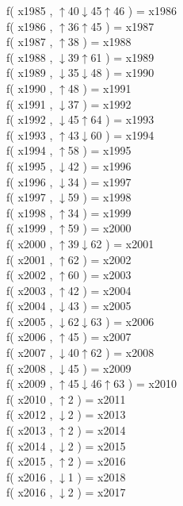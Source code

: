 f( x1985 , $\uparrow$40$\downarrow$45$\uparrow$46 ) = x1986 \\
f( x1986 , $\uparrow$36$\uparrow$45 ) = x1987 \\
f( x1987 , $\uparrow$38 ) = x1988 \\
f( x1988 , $\downarrow$39$\uparrow$61 ) = x1989 \\
f( x1989 , $\downarrow$35$\downarrow$48 ) = x1990 \\
f( x1990 , $\uparrow$48 ) = x1991 \\
f( x1991 , $\downarrow$37 ) = x1992 \\
f( x1992 , $\downarrow$45$\uparrow$64 ) = x1993 \\
f( x1993 , $\uparrow$43$\downarrow$60 ) = x1994 \\
f( x1994 , $\uparrow$58 ) = x1995 \\
f( x1995 , $\downarrow$42 ) = x1996 \\
f( x1996 , $\downarrow$34 ) = x1997 \\
f( x1997 , $\downarrow$59 ) = x1998 \\
f( x1998 , $\uparrow$34 ) = x1999 \\
f( x1999 , $\uparrow$59 ) = x2000 \\
f( x2000 , $\uparrow$39$\downarrow$62 ) = x2001 \\
f( x2001 , $\uparrow$62 ) = x2002 \\
f( x2002 , $\uparrow$60 ) = x2003 \\
f( x2003 , $\uparrow$42 ) = x2004 \\
f( x2004 , $\downarrow$43 ) = x2005 \\
f( x2005 , $\downarrow$62$\downarrow$63 ) = x2006 \\
f( x2006 , $\uparrow$45 ) = x2007 \\
f( x2007 , $\downarrow$40$\uparrow$62 ) = x2008 \\
f( x2008 , $\downarrow$45 ) = x2009 \\
f( x2009 , $\uparrow$45$\downarrow$46$\uparrow$63 ) = x2010 \\
f( x2010 , $\uparrow$2 ) = x2011 \\
f( x2012 , $\downarrow$2 ) = x2013 \\
f( x2013 , $\uparrow$2 ) = x2014 \\
f( x2014 , $\downarrow$2 ) = x2015 \\
f( x2015 , $\uparrow$2 ) = x2016 \\
f( x2016 , $\downarrow$1 ) = x2018 \\
f( x2016 , $\downarrow$2 ) = x2017 \\
